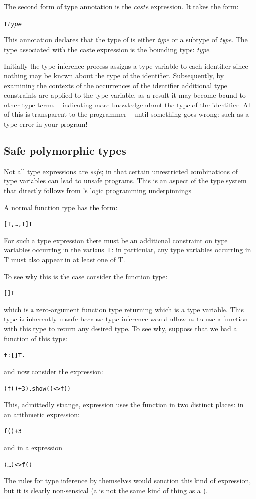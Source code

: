 The second form of type annotation is the \emph{caste} expression. It takes the form:
\begin{alltt}
T \typearrow \emph{type}
\end{alltt}
This annotation declares that the type of  is either \emph{type} or a subtype of \emph{type}. The type associated with the caste expression is the bounding type: \emph{type}.

Initially the type inference process assigns a type variable to each identifier since nothing may be known about the type of the identifier. Subsequently, by examining the contexts of the occurrences of the identifier additional type constraints are applied to the type variable, as a result it may become bound to other type terms -- indicating more knowledge about the type of the identifier. All of this is transparent to the programmer -- until something goes wrong: such as a type error in your program!

\subsection{Safe polymorphic types}
Not all type expressions are \emph{safe}; in that certain unrestricted combinations of type variables can lead to unsafe programs. This is an aspect of the type system that directly follows from \go's logic programming underpinnings.

A normal function type has the form:
\begin{alltt}
[T,\ldots,T\subn]\funarrow{}T
\end{alltt}
For such a type expression there must be an additional constraint on type variables occurring in the various T: in particular, any type variables occurring in T must also appear in at least one of T\subi.

To see why this is the case consider the function type:
\begin{alltt}
[]\funarrow{}T
\end{alltt}
which is a zero-argument function type returning  which is a type variable. This type is inherently unsafe because type inference would allow us to use a function with this type to return any desired type. To see why, suppose that we had a function  of this type:
\begin{alltt}
f:[]\funarrow{}T.
\end{alltt}
and now consider the expression:
\begin{alltt}
(f()+3).show()<>f()
\end{alltt}
This, admittedly strange, expression uses the function  in two distinct places: in an arithmetic expression:
\begin{alltt}
f()+3
\end{alltt}
and in a  expression
\begin{alltt}
(\ldots)<>f()
\end{alltt}
The rules for type inference by themselves would sanction this kind of expression, but it is clearly non-sensical (a  is not the same kind of thing as a ).

